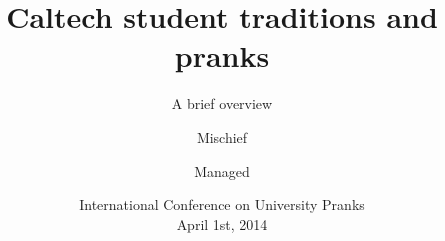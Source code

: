 \title[Caltech Tradition \& Pranks]
{\bfseries{Caltech student traditions and pranks}}

\subtitle{A brief overview}

\author[Mischief \& Managed]
{Mischief \and Managed}


\date[ICUP, 2014]
{International Conference on University Pranks\\April 1st, 2014}